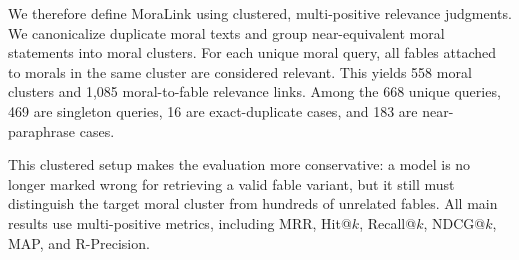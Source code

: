 \documentclass[11pt]{article}
\begin{document}
We therefore define MoraLink using clustered, multi-positive relevance
judgments. We canonicalize duplicate moral texts and group near-equivalent moral
statements into moral clusters. For each unique moral query, all fables attached
to morals in the same cluster are considered relevant. This yields 558 moral
clusters and 1,085 moral-to-fable relevance links. Among the 668 unique queries,
469 are singleton queries, 16 are exact-duplicate cases, and 183 are
near-paraphrase cases.

This clustered setup makes the evaluation more conservative: a model is no
longer marked wrong for retrieving a valid fable variant, but it still must
distinguish the target moral cluster from hundreds of unrelated fables. All main
results use multi-positive metrics, including MRR, Hit@$k$, Recall@$k$,
NDCG@$k$, MAP, and R-Precision.




\end{document}
